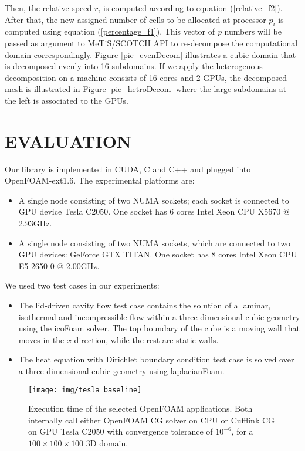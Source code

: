 \documentclass[3p,times]{elsarticle}
\begin{document}
Then, the relative speed \emph{$r_{i}$} is computed according to equation (\ref{relative_f2}). After that, the new assigned number of cells to be allocated at processor \emph{$p_{i}$} is computed using equation (\ref{percentage_f1}). This vector of \emph{p} numbers  will be passed as argument to MeTiS/SCOTCH API to re-decompose the computational domain correspondingly. Figure \ref{pic_evenDecom} illustrates a cubic domain that is decomposed evenly into 16 subdomains. If we apply the heterogenous decomposition  on a machine consists of 16 cores and 2 GPUs, the decomposed mesh is illustrated in Figure \ref{pic_hetroDecom} where the large subdomains at the left is associated to the GPUs. \\

\section{EVALUATION}
Our library is implemented in CUDA, C and C++ and plugged into OpenFOAM-ext1.6. The experimental platforms are: 
\begin{itemize}
\item A single node consisting of two NUMA sockets; each socket is connected to GPU device Tesla C2050. One socket has 6 cores Intel Xeon CPU X5670  @ 2.93GHz. 
\item A single node consisting of two NUMA sockets, which are connected to two GPU devices: GeForce GTX TITAN. One socket has 8 cores Intel Xeon CPU E5-2650 0 @ 2.00GHz. 
\end{itemize}
We used two test cases in our experiments:
\begin{itemize}
\item The lid-driven cavity flow test case contains the solution of a laminar, isothermal and incompressible flow within a three-dimensional cubic geometry using the icoFoam solver. The top boundary of the cube is a moving wall that moves in the \emph{$x$} direction, while the rest are static walls.
\item The heat equation with Dirichlet boundary condition test case is solved over a three-dimensional cubic geometry using laplacianFoam.
\end{itemize}


\begin{figure}[h!]
\begin{center}
\texttt{[image: img/tesla\_baseline]} 
\caption{ Execution time of the selected OpenFOAM applications. Both internally call either OpenFOAM CG solver on CPU or Cufflink CG on GPU Tesla C2050 with convergence tolerance of $10^{-6}$, for a $100 \times 100 \times 100$ 3D domain.}
\label{tesla_base}
\end{center}
\end{figure}
\end{document}
